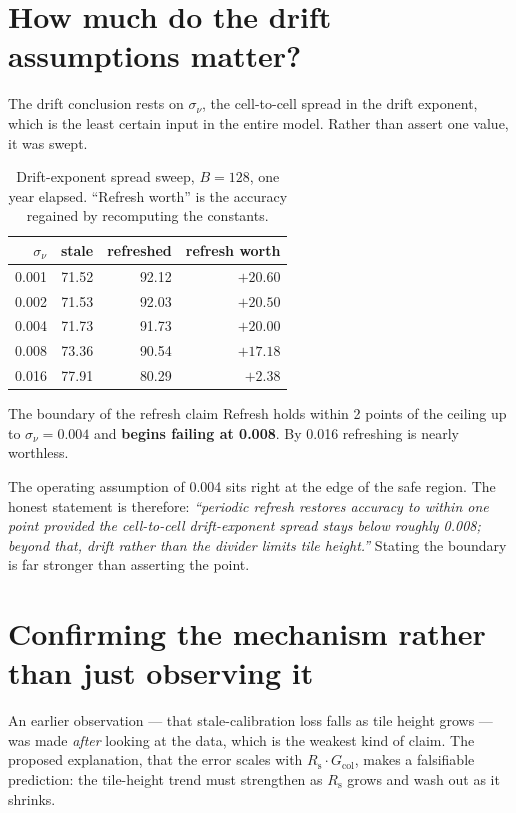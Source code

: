 \documentclass[11pt,a4paper]{report}
\newcommand{\Rs}{R_{\mathrm{s}}}
\newcommand{\Gcol}{G_{\mathrm{col}}}
\begin{document}
\section{How much do the drift assumptions matter?}

The drift conclusion rests on $\sigma_\nu$, the cell-to-cell spread in the
drift exponent, which is the least certain input in the entire model. Rather
than assert one value, it was swept.

\begin{table}[h]
\centering
\caption{Drift-exponent spread sweep, $B{=}128$, one year elapsed. ``Refresh
worth'' is the accuracy regained by recomputing the constants.}
\begin{tabular}{rrrr}
\toprule
$\sigma_\nu$ & stale & refreshed & refresh worth \\
\midrule
0.001 & 71.52 & 92.12 & $+20.60$ \\
0.002 & 71.53 & 92.03 & $+20.50$ \\
0.004 & 71.73 & 91.73 & $+20.00$ \\
0.008 & 73.36 & 90.54 & $+17.18$ \\
0.016 & 77.91 & 80.29 & $\mathbf{+2.38}$ \\
\bottomrule
\end{tabular}
\end{table}

\begin{keybox}{The boundary of the refresh claim}
Refresh holds within 2 points of the ceiling up to $\sigma_\nu = 0.004$ and
\textbf{begins failing at 0.008}. By 0.016 refreshing is nearly worthless.

The operating assumption of 0.004 sits right at the edge of the safe region.
The honest statement is therefore: \emph{``periodic refresh restores accuracy
to within one point provided the cell-to-cell drift-exponent spread stays
below roughly 0.008; beyond that, drift rather than the divider limits tile
height.''} Stating the boundary is far stronger than asserting the point.
\end{keybox}

\section{Confirming the mechanism rather than just observing it}

An earlier observation --- that stale-calibration loss falls as tile height
grows --- was made \emph{after} looking at the data, which is the weakest kind
of claim. The proposed explanation, that the error scales with
$\Rs \cdot \Gcol$, makes a falsifiable prediction: the tile-height trend must
strengthen as $\Rs$ grows and wash out as it shrinks.
\end{document}
